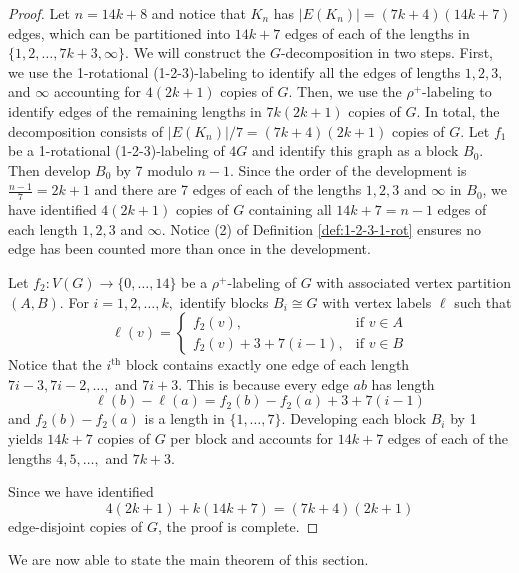 \begin{proof}
    Let $n=14k+8$ and notice that $K_n$ has $|E(K_n)|=(7k+4)(14k+7)$ edges, which can be partitioned into $14k+7$ edges of each of the lengths in $\{1,2,\dots,7k+3,\infty\}.$  We will construct the $G$-decomposition in two steps. First, we use the 1-rotational (1-2-3)-labeling to identify all the edges of lengths $1,2,3,$ and $\infty$ accounting for $4(2k+1)$ copies of $G$. Then, we use the $\rho^{+}$-labeling to identify edges of the remaining lengths in $7k(2k+1)$ copies of $G$. In total, the decomposition consists of $|E(K_n)|/7=(7k+4)(2k+1)$ copies of $G.$
    Let $f_1$ be a 1-rotational (1-2-3)-labeling of $4G$ and identify this graph as a block $B_0$. Then develop $B_0$ by 7 modulo $n-1$. Since the order of the development is $\frac{n-1}{7}=2k+1$ and there are 7 edges of each of the lengths $1,2,3$ and $\infty$ in $B_0$, we have identified $4(2k+1)$ copies of $G$ containing all $14k+7=n-1$ edges of each length $1,2,3$ and $\infty$. Notice (2) of Definition \ref{def:1-2-3-1-rot} ensures no edge has been counted more than once in the development.

    Let $f_2:V(G) \rightarrow \{0,\dots,14\}$ be a $\rho^{+}$-labeling of $G$ with associated vertex partition $(A,B).$ For $i=1,2,\dots,k,$ identify blocks $B_i \cong G$ with vertex labels $\ell$ such that
    \[
    \ell(v)=
    \begin{cases}
        f_2(v), & \textrm{if } v \in A \\
        f_2(v)+3+7(i-1), & \textrm{if } v \in B
    \end{cases}
    \]
    Notice that the $i^{\textrm{th}}$ block contains exactly one edge of each length $7i-3,7i-2, \dots,$ and $ 7i+3.$ This is because every edge $ab$ has length 
    \[
    \ell(b)-\ell(a)=f_2(b)-f_2(a)+3+7(i-1)
    \]
    and $f_2(b)-f_2(a)$ is a length in $\{1,\dots,7\}.$
    Developing each block $B_i$ by 1 yields $14k+7$ copies of $G$ per block and accounts for $14k+7$ edges of each of the lengths $4,5,\dots,$ and $7k+3$.

    Since we have identified
    \[
    4(2k+1)+k(14k+7)=(7k+4)(2k+1)
    \]
    edge-disjoint copies of $G$, the proof is complete.
\end{proof}

We are now able to state the main theorem of this section. 

